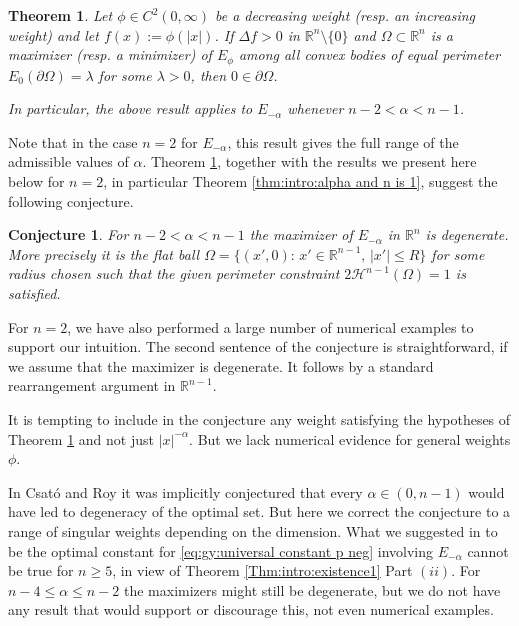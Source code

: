 \documentclass[10pt,leqno]{amsart}
\newcommand{\R}[0]{\mathbb{R}}
\newcommand{\p}{\partial}
\newtheorem{Conjecture}{Conjecture}
\newtheorem{Theorem}{Theorem}
\numberwithin{Theorem}{section}
\theoremstyle{definition}
\theoremstyle{remark}
\numberwithin{equation}{section}
\numberwithin{equation}{section}
\begin{document}
\begin{Theorem} \label{thm:shifting_generalized}
    Let $\phi \in C^2(0, \infty)$ be a decreasing weight (resp. an increasing weight) and let $f(x):=\phi(|x|)$. If $\Delta f>0$ in $\R^n \setminus \{ 0\}$ and $\Omega \subset \R^n$ is a maximizer (resp. a minimizer) of $E_{\phi}$ among all convex bodies of equal perimeter $E_0( \p \Omega)=\lambda$ for some $\lambda>0$, then $0 \in \p \Omega$.
    
    In particular, the above result applies to $E_{-\alpha}$ whenever $n-2< \alpha < n-1$.
\end{Theorem}



Note that in the case $n=2$ for $E_{-\alpha}$, this result gives the full range of the admissible values of $\alpha$.
Theorem \ref{thm:shifting_generalized}, together with the  results we present here below for $n=2$, in particular Theorem \ref{thm:intro:alpha and n is 1}, suggest the following conjecture. 



\begin{Conjecture}
\label{conjecture:intro:alpha}
For $n-2<\alpha<n-1$  the maximizer of $E_{-\alpha}$ in $\R^n$ is degenerate. More precisely it is the flat ball $\Omega=\{(x',0):\, x'\in\R^{n-1},\, |x'|\leq R\}$ for some radius chosen such that the given perimeter constraint $2\mathcal{H}^{n-1}(\Omega)=1$ is satisfied. 
\end{Conjecture}

For $n=2$, we have also performed a large number of numerical examples to support our intuition.
The second sentence of the conjecture is straightforward, if we assume that the maximizer is degenerate. It follows by a standard rearrangement argument in $\R^{n-1}.$

It is tempting to include in the conjecture any weight satisfying the hypotheses of Theorem \ref{thm:shifting_generalized} and not just $|x|^{-\alpha}$. But we lack numerical evidence for general weights $\phi$.

In Csat\'o and Roy \cite{Csato2024} it was implicitly conjectured that every $\alpha\in (0,n-1)$ would have led to degeneracy of the optimal set.  But here we correct the conjecture to a range of  singular weights depending on the dimension. What we suggested in \cite{Csato2024} to be the optimal constant for \eqref{eq:gy:universal constant p neg} involving $E_{-\alpha}$  cannot be true for $n\geq 5$, in view of Theorem \ref{Thm:intro:existence1} Part $(ii)$. For $n-4\leq \alpha\leq n-2$ the maximizers might still be degenerate, but we do not have any result that would support or discourage this, not even numerical examples. 
\end{document}
